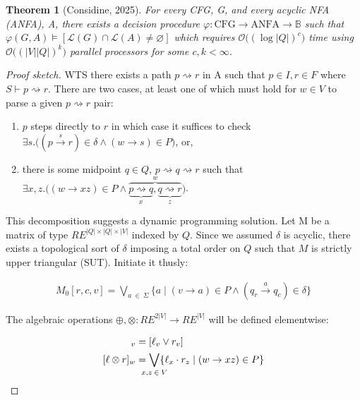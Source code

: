 \documentclass[11pt]{article}
\theoremstyle{plain}
\newtheorem{theorem}{Theorem}
\theoremstyle{definition}
\begin{document}
\begin{theorem}[Considine, 2025]
  For every CFG, G, and every acyclic NFA (ANFA), A, there exists a decision procedure $\varphi: \text{CFG} \rightarrow \text{ANFA} \rightarrow \mathbb{B}$ such that $\varphi(G, A) \models [\mathcal{L}(G)\cap\mathcal{L}(A) \neq \varnothing]$ which requires $\mathcal{O}\big((\log |Q|)^c\big)$ time using $\mathcal{O}\big((|V||Q|)^k\big)$ parallel processors for some $c, k < \infty$.
\end{theorem}

\begin{proof}[Proof sketch]
  WTS there exists a path $p \rightsquigarrow r$ in A such that $p\in I, r\in F$ where $S \vdash p \rightsquigarrow r$. There are two cases, at least one of which must hold for $w \in V$ to parse a given $p \rightsquigarrow r$ pair:

  \begin{enumerate}
    \item $p$ steps directly to $r$ in which case it suffices to check $\exists s.\big((p \overset{s}{\rightarrow} r)\in \delta \land (w \rightarrow s) \in P\big)$, or,
    \item there is some midpoint $q \in Q$, $p \rightsquigarrow q \rightsquigarrow r$ such that $\exists x, z.\big((w \rightarrow xz) \in P\land\overbrace{\underbrace{p \rightsquigarrow q}_x, \underbrace{q \rightsquigarrow r}_z}^w\big)$.
  \end{enumerate}

\noindent This decomposition suggests a dynamic programming solution. Let M be a matrix of type $RE^{|Q|\times|Q|\times|V|}$  indexed by $Q$. Since we assumed $\delta$ is acyclic, there exists a topological sort of $\delta$ imposing a total order on $Q$ such that $M$ is strictly upper triangular (SUT). Initiate it thusly:

\begin{align}
    M_0[r, c, v] = \bigvee_{a\:\in\:\Sigma} \{a \mid (v \rightarrow a) \in P \land (q_r \overset{a}{\rightarrow} q_c)\in \delta\}
\end{align}

\noindent The algebraic operations $\oplus, \otimes: RE^{2|V|} \rightarrow RE^{|V|}$ will be defined elementwise:

\begin{align}
    [\ell \oplus r]_v &= [\ell_v \lor r_v]\\
  [\ell \otimes r]_w &= \bigvee_{\mathclap{x, z\:\in\:V}}\{\ell_x \cdot r_z \mid (w \rightarrow xz) \in P\}
\end{align}


\end{proof}
\end{document}
